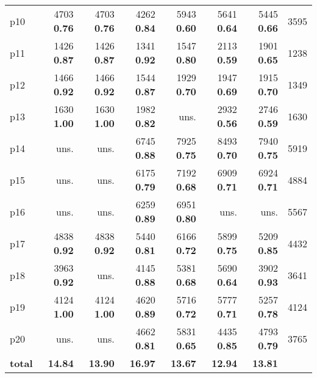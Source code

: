 \begin{tabular}{|l|rrrrrr|r|}
p10 & {\footnotesize 4703} \textbf{0.76} & {\footnotesize 4703} \textbf{0.76} & {\footnotesize 4262} \textbf{0.84} & {\footnotesize 5943} \textbf{0.60} & {\footnotesize 5641} \textbf{0.64} & {\footnotesize 5445} \textbf{0.66} & 3595\\
p11 & {\footnotesize 1426} \textbf{0.87} & {\footnotesize 1426} \textbf{0.87} & {\footnotesize 1341} \textbf{0.92} & {\footnotesize 1547} \textbf{0.80} & {\footnotesize 2113} \textbf{0.59} & {\footnotesize 1901} \textbf{0.65} & 1238\\
p12 & {\footnotesize 1466} \textbf{0.92} & {\footnotesize 1466} \textbf{0.92} & {\footnotesize 1544} \textbf{0.87} & {\footnotesize 1929} \textbf{0.70} & {\footnotesize 1947} \textbf{0.69} & {\footnotesize 1915} \textbf{0.70} & 1349\\
p13 & {\footnotesize 1630} \textbf{1.00} & {\footnotesize 1630} \textbf{1.00} & {\footnotesize 1982} \textbf{0.82} & uns. & {\footnotesize 2932} \textbf{0.56} & {\footnotesize 2746} \textbf{0.59} & 1630\\
p14 & uns. & uns. & {\footnotesize 6745} \textbf{0.88} & {\footnotesize 7925} \textbf{0.75} & {\footnotesize 8493} \textbf{0.70} & {\footnotesize 7940} \textbf{0.75} & 5919\\
p15 & uns. & uns. & {\footnotesize 6175} \textbf{0.79} & {\footnotesize 7192} \textbf{0.68} & {\footnotesize 6909} \textbf{0.71} & {\footnotesize 6924} \textbf{0.71} & 4884\\
p16 & uns. & uns. & {\footnotesize 6259} \textbf{0.89} & {\footnotesize 6951} \textbf{0.80} & uns. & uns. & 5567\\
p17 & {\footnotesize 4838} \textbf{0.92} & {\footnotesize 4838} \textbf{0.92} & {\footnotesize 5440} \textbf{0.81} & {\footnotesize 6166} \textbf{0.72} & {\footnotesize 5899} \textbf{0.75} & {\footnotesize 5209} \textbf{0.85} & 4432\\
p18 & {\footnotesize 3963} \textbf{0.92} & uns. & {\footnotesize 4145} \textbf{0.88} & {\footnotesize 5381} \textbf{0.68} & {\footnotesize 5690} \textbf{0.64} & {\footnotesize 3902} \textbf{0.93} & 3641\\
p19 & {\footnotesize 4124} \textbf{1.00} & {\footnotesize 4124} \textbf{1.00} & {\footnotesize 4620} \textbf{0.89} & {\footnotesize 5716} \textbf{0.72} & {\footnotesize 5777} \textbf{0.71} & {\footnotesize 5257} \textbf{0.78} & 4124\\
p20 & uns. & uns. & {\footnotesize 4662} \textbf{0.81} & {\footnotesize 5831} \textbf{0.65} & {\footnotesize 4435} \textbf{0.85} & {\footnotesize 4793} \textbf{0.79} & 3765\\
\hline
\textbf{total} & \textbf{14.84} & \textbf{13.90} & \textbf{16.97} & \textbf{13.67} & \textbf{12.94} & \textbf{13.81} & \\
\hline
\end{tabular}

